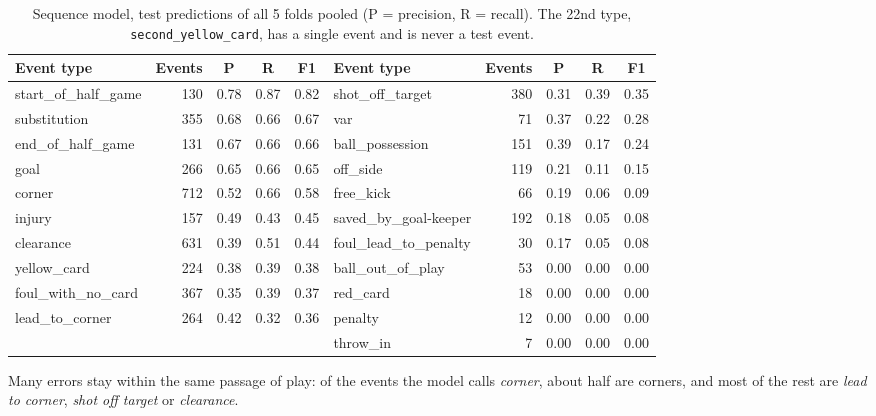 \documentclass[11pt]{article}
\begin{document}
\begin{table}[h]
\centering\footnotesize
\begin{tabular}{lrccc@{\hspace{2.5em}}lrccc}
\toprule
Event type & Events & P & R & F1 & Event type & Events & P & R & F1\\
\midrule
start\_of\_half\_game & 130 & 0.78 & 0.87 & 0.82 & shot\_off\_target & 380 & 0.31 & 0.39 & 0.35\\
substitution & 355 & 0.68 & 0.66 & 0.67 & var & 71 & 0.37 & 0.22 & 0.28\\
end\_of\_half\_game & 131 & 0.67 & 0.66 & 0.66 & ball\_possession & 151 & 0.39 & 0.17 & 0.24\\
goal & 266 & 0.65 & 0.66 & 0.65 & off\_side & 119 & 0.21 & 0.11 & 0.15\\
corner & 712 & 0.52 & 0.66 & 0.58 & free\_kick & 66 & 0.19 & 0.06 & 0.09\\
injury & 157 & 0.49 & 0.43 & 0.45 & saved\_by\_goal-keeper & 192 & 0.18 & 0.05 & 0.08\\
clearance & 631 & 0.39 & 0.51 & 0.44 & foul\_lead\_to\_penalty & 30 & 0.17 & 0.05 & 0.08\\
yellow\_card & 224 & 0.38 & 0.39 & 0.38 & ball\_out\_of\_play & 53 & 0.00 & 0.00 & 0.00\\
foul\_with\_no\_card & 367 & 0.35 & 0.39 & 0.37 & red\_card & 18 & 0.00 & 0.00 & 0.00\\
lead\_to\_corner & 264 & 0.42 & 0.32 & 0.36 & penalty & 12 & 0.00 & 0.00 & 0.00\\
 & & & & & throw\_in & 7 & 0.00 & 0.00 & 0.00\\
\bottomrule
\end{tabular}
\caption{Sequence model, test predictions of all 5 folds pooled (P = precision, R = recall). The 22nd type,
\texttt{second\_yellow\_card}, has a single event and is never a test event.}
\label{tab:perclass}
\end{table}

Many errors stay within the same passage of play: of the events the model calls \emph{corner}, about
half are corners, and most of the rest are \emph{lead to corner}, \emph{shot off target} or \emph{clearance}.
\end{document}
